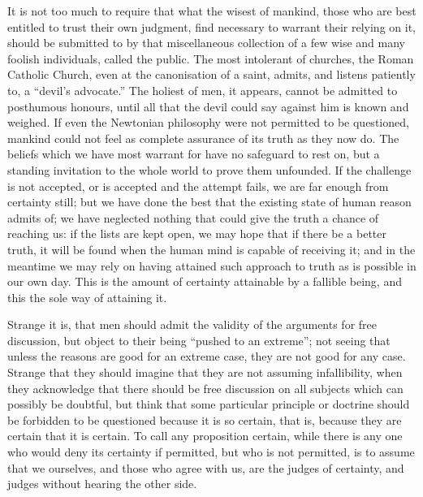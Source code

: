 \documentclass[11pt,openany]{book}
\begin{document}
It is not too much to require that what the wisest of mankind, those who are best entitled to trust their own judgment, find necessary to warrant their relying on it, should be submitted to by that miscellaneous collection of a few wise and many foolish individuals, called the public. The most intolerant of churches, the Roman Catholic Church, even at the canonisation of a saint, admits, and listens patiently to, a ``devil's advocate.'' The holiest of men, it appears, cannot be admitted to posthumous honours, until all that the devil could say against him is known and weighed. If even the Newtonian philosophy were not permitted to be questioned, mankind could not feel as complete assurance of its truth as they now do. The beliefs which we have most warrant for have no safeguard to rest on, but a standing invitation to the whole world to prove them unfounded. If the challenge is not accepted, or is accepted and the attempt fails, we are far enough from certainty still; but we have done the best that the existing state of human reason admits of; we have neglected nothing that could give the truth a chance of reaching us: if the lists are kept open, we may hope that if there be a better truth, it will be found when the human mind is capable of receiving it; and in the meantime we may rely on having attained such approach to truth as is possible in our own day. This is the amount of certainty attainable by a fallible being, and this the sole way of attaining it.

Strange it is, that men should admit the validity of the arguments for free discussion, but object to their being ``pushed to an extreme''; not seeing that unless the reasons are good for an extreme case, they are not good for any case. Strange that they should imagine that they are not assuming infallibility, when they acknowledge that there should be free discussion on all subjects which can possibly be doubtful, but think that some particular principle or doctrine should be forbidden to be questioned because it is so certain, that is, because they are certain that it is certain. To call any proposition certain, while there is any one who would deny its certainty if permitted, but who is not permitted, is to assume that we ourselves, and those who agree with us, are the judges of certainty, and judges without hearing the other side.
\end{document}
